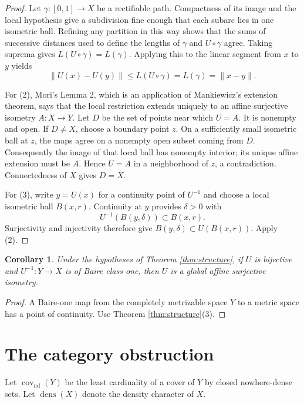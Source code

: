 \documentclass[11pt]{article}
\newtheorem{corollary}[theorem]{Corollary}
\begin{document}
\begin{proof}
Let $\gamma:[0,1]\to X$ be a rectifiable path.  Compactness of its image and
the local hypothesis give a subdivision fine enough that each subarc lies in
one isometric ball.  Refining any partition in this way shows that the sums
of successive distances used to define the lengths of $\gamma$ and
$U\circ\gamma$ agree.  Taking suprema gives
$L(U\circ\gamma)=L(\gamma)$.  Applying this to the linear segment from $x$
to $y$ yields
\[
 \|U(x)-U(y)\|\leq L(U\circ\gamma)=L(\gamma)=\|x-y\|.
\]

For (2), Mori's Lemma 2, which is an application of Mankiewicz's extension
theorem, says that the local restriction extends uniquely to an affine
surjective isometry $A:X\to Y$.  Let $D$ be the set of points near which
$U=A$.  It is nonempty and open.  If $D\ne X$, choose a boundary point $z$.
On a sufficiently small isometric ball at $z$, the maps agree on a nonempty
open subset coming from $D$.  Consequently the image of that local ball has
nonempty interior; its unique affine extension must be $A$.  Hence $U=A$ in
a neighborhood of $z$, a contradiction.  Connectedness of $X$ gives
$D=X$.

For (3), write $y=U(x)$ for a continuity point of $U^{-1}$ and choose a
local isometric ball $B(x,r)$.  Continuity at $y$ provides $\delta>0$ with
\[
 U^{-1}(B(y,\delta))\subset B(x,r).
\]
Surjectivity and injectivity therefore give
$B(y,\delta)\subset U(B(x,r))$.  Apply (2).
\end{proof}

\begin{corollary}\label{cor:b1}
Under the hypotheses of Theorem \ref{thm:structure}, if $U$ is bijective and
$U^{-1}:Y\to X$ is of Baire class one, then $U$ is a global affine
surjective isometry.
\end{corollary}

\begin{proof}
A Baire-one map from the completely metrizable space $Y$ to a metric space
has a point of continuity.  Use Theorem \ref{thm:structure}(3).
\end{proof}

\section{The category obstruction}

Let $\operatorname{cov}_{\mathrm{nd}}(Y)$ be the least cardinality of a cover
of $Y$ by closed nowhere-dense sets.  Let $\operatorname{dens}(X)$ denote
the density character of $X$.
\end{document}
